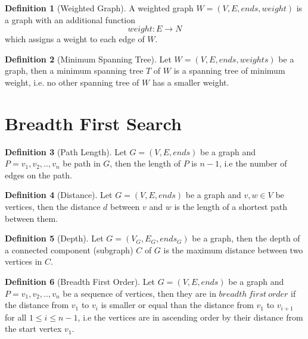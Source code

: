 \documentclass{report}
\theoremstyle{plain}
\theoremstyle{definition}
\newtheorem{definition}{Definition}
\theoremstyle{remark}
\begin{document}
\begin{definition}[Weighted Graph]
A weighted graph $W = (V, E, ends, weight)$ is a graph with an additional function
  \begin{equation}
  weight:E\to N
  \end{equation}
which assigns a weight to each edge of $W$.
\end{definition}

\begin{definition}[Minimum Spanning Tree]
Let $W = (V, E, ends, weights)$ be a graph, then a minimum spanning tree $T$ of $W$ is a spanning tree of minimum weight, i.e. no other spanning tree of $W$ has a smaller weight.
\end{definition}

\section*{Breadth First Search}

\begin{definition}[Path Length]
Let $G = (V, E, ends)$ be a graph and $P=v_1,v_2,..,v_n$ be path in $G$, then the length of $P$ is $n-1$, i.e the number of edges on the path. 
\end{definition}

\begin{definition}[Distance]
Let $G = (V, E, ends)$ be a graph and $v, w \in V$ be vertices, then the distance $d$ between $v$ and $w$ is the length of a shortest path between them. 
\end{definition}

\begin{definition}[Depth]
Let $G = (V_G, E_G, ends_G)$ be a graph, then the depth of a connected component (subgraph) $C$ of $G$ is the maximum distance between two vertices in $C$.
\end{definition}

\begin{definition}[Breadth First Order]
Let $G = (V, E, ends)$ be a graph and $P=v_1,v_2,..,v_n$ be a sequence of vertices, then they are in $breadth \ first \ order$ if the distance from $v_1$ to $v_i$ is smaller or equal than the distance from $v_1$ to $v_{i+1}$ for all $1 \leq i \leq n - 1$, i.e the vertices are in ascending order by their distance from the start vertex $v_1$.
\end{definition}
\end{document}
